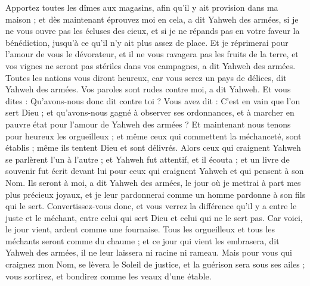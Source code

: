 \begin{multicols}{2}
Apportez toutes les dîmes aux magasins, afin qu'il y ait provision dans ma maison ; et dès maintenant éprouvez moi en cela, a dit Yahweh des armées, si je ne vous ouvre pas les écluses des cieux, et si je ne répands pas en votre faveur la bénédiction, jusqu'à ce qu'il n'y ait plus assez de place.
Et je réprimerai pour l'amour de vous le dévorateur, et il ne vous ravagera pas les fruits de la terre, et vos vignes ne seront pas stériles dans vos campagnes, a dit Yahweh des armées.
Toutes les nations vous diront heureux, car vous serez un pays de délices, dit Yahweh des armées.
Vos paroles sont rudes contre moi, a dit Yahweh. Et vous dites : Qu'avons-nous donc dit contre toi ?
Vous avez dit : C'est en vain que l’on sert Dieu ; et qu'avons-nous gagné à observer ses ordonnances, et à marcher en pauvre état pour l'amour de Yahweh des armées ?
Et maintenant nous tenons pour heureux les orgueilleux ; et même ceux qui commettent la méchanceté, sont établis ; même ils tentent Dieu et sont délivrés.
Alors ceux qui craignent Yahweh se parlèrent l'un à l’autre ; et Yahweh fut attentif, et il écouta ; et un livre de souvenir fut écrit devant lui pour ceux qui craignent Yahweh et qui pensent à son Nom.
Ils seront à moi, a dit Yahweh des armées, le jour où je mettrai à part mes plus précieux joyaux, et je leur pardonnerai comme un homme pardonne à son fils qui le sert.
Convertissez-vous donc, et vous verrez la différence qu'il y a entre le juste et le méchant, entre celui qui sert Dieu et celui qui ne le sert pas.
\VerseOne{}Car voici, le jour vient, ardent comme une fournaise. Tous les orgueilleux et tous les méchants seront comme du chaume ; et ce jour qui vient les embrasera, dit Yahweh des armées, il ne leur laissera ni racine ni rameau.
Mais pour vous qui craignez mon Nom, se lèvera le Soleil de justice, et la guérison sera sous ses ailes ; vous sortirez, et bondirez comme les veaux d’une étable.

\end{multicols}
